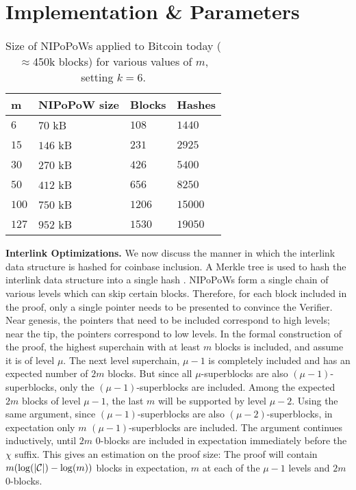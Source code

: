 \section{Implementation \& Parameters}

\begin{table}
  \caption{
    \label{table.size}
    Size of NIPoPoWs applied to Bitcoin today
    ($\approx$450k blocks) for various values of $m$,
    setting $k = 6$.
  }
  \centering
  \begin{tabular}{l|l|l|l}
      {\bf m}  & {\bf NIPoPoW size} & {\bf Blocks} & {\bf
      Hashes}\\
      \hline
      $6$   & $70$  kB & $108$ & $1440$  \\
      $15$  & $146$ kB & $231$ & $2925$  \\
      $30$  & $270$ kB & $426$ & $5400$  \\
      $50$  & $412$ kB & $656$ & $8250$ \\
      $100$ & $750$ kB & $1206$ & $15000$ \\
      $127$ & $952$ kB & $1530$ & $19050$ \\
  \end{tabular}
\end{table}

\textbf{Interlink Optimizations.}
We now discuss the manner in which the interlink data structure is hashed for
coinbase inclusion. A Merkle tree is used to hash the interlink data structure
into a single hash \cite{KLS}. NIPoPoWs form a single chain of various levels
which can skip certain blocks. Therefore, for each block included in the proof,
only a single pointer needs to be presented to convince the Verifier. Near
genesis, the pointers that need to be included correspond to high levels; near
the tip, the pointers correspond to low levels. In the formal construction of
the proof, the highest superchain with at least $m$ blocks is included, and
assume it is of level $\mu$. The next level superchain, $\mu - 1$ is completely
included and has an expected number of $2m$ blocks. But since all
$\mu$-superblocks are also $(\mu - 1)$-superblocks, only the $(\mu -
1)$-superblocks are included. Among the expected $2m$ blocks of level $\mu - 1$,
the last $m$ will be supported by level $\mu - 2$. Using the same argument,
since $(\mu - 1)$-superblocks are also $(\mu - 2)$-superblocks, in expectation
only $m$ $(\mu-1)$-superblocks are included. The argument continues inductively,
until $2m$ $0$-blocks are included in expectation immediately before the $\chi$
suffix. This gives an estimation on the proof size: The proof will contain $m
(\log(|\mathcal{C}|) - \log(m))$ blocks in expectation, $m$ at each of the $\mu - 1$
levels and $2m$ $0$-blocks.


